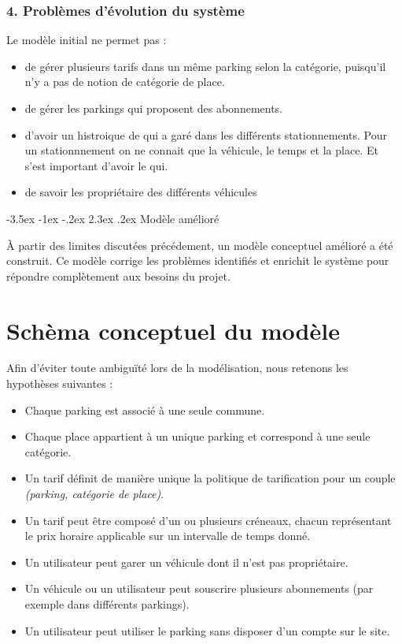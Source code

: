 \documentclass[a4paper,12pt]{report}
\makeatletter
\def\chapter{\@startsection {chapter}{0}{\z@}
                                   {-3.5ex \@plus -1ex \@minus -.2ex}
                                   {2.3ex \@plus.2ex}
                                   {\normalfont\huge\bfseries}}
\makeatother
\begin{document}
\subsubsection*{4. Problèmes d’évolution du système}
Le modèle initial ne permet pas :
\begin{itemize}
    \item de gérer plusieurs tarifs dans un même parking selon la catégorie, puisqu'il n'y a pas de notion de catégorie de place.
    \item de gérer les parkings qui proposent des abonnements.
    \item d'avoir un histroique de qui a garé dans les différents stationnements. Pour un stationnnement on ne connait que la véhicule, le temps et la place. Et s'est important d'avoir le qui.
    \item de savoir les propriétaire des différents véhicules

\end{itemize}

\chapter{Modèle amélioré}

À partir des limites discutées précédement, un modèle conceptuel amélioré a été construit. Ce modèle corrige 
les problèmes identifiés et enrichit le système pour répondre complètement aux besoins du projet.


\section{Schèma conceptuel du modèle}

Afin d’éviter toute ambiguïté lors de la modélisation, nous retenons les hypothèses suivantes :
\begin{itemize}
    \item Chaque parking est associé à une seule commune.
    \item Chaque place appartient à un unique parking et correspond à une seule catégorie.
    \item Un tarif définit de manière unique la politique de tarification pour un couple \textit{(parking, catégorie de place)}.
    \item Un tarif peut être composé d’un ou plusieurs créneaux, chacun représentant le prix horaire applicable sur un intervalle de temps donné.
    \item Un utilisateur peut garer un véhicule dont il n’est pas propriétaire.
    \item Un véhicule ou un utilisateur peut souscrire plusieurs abonnements (par exemple dans différents parkings).
    \item Un utilisateur peut utiliser le parking sans disposer d’un compte sur le site.
\end{itemize}
\end{document}
